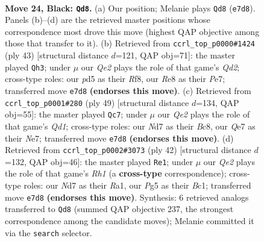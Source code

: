 \documentclass[11pt]{article}
\begin{document}
\clearpage

\begin{figure}[p]\centering
\begin{subfigure}{0.46\textwidth}\centering
\resizebox{\linewidth}{!}{%
\newchessgame
\chessboard[
  setfen={rn2r3/p2nqpkP/3p1b2/3P2p1/1R2P1P1/2NQ4/4N3/2B1K2R b K - 0 24},
  showmover=false,
  pgfstyle=straightmove, color=movearrow, markmove={e7-d8}
]}
\caption{}
\end{subfigure}\hfill
\begin{subfigure}{0.46\textwidth}\centering
\resizebox{\linewidth}{!}{%
\newchessgame
\chessboard[
  setfen={5rk1/3qppb1/2b3pp/r6n/1R5P/2NP1NP1/2QBPP2/5RK1 b - - 1 22},
  showmover=false,
  pgfstyle=straightmove, color=movearrow, markmove={d7-h3}
]}
\caption{}
\end{subfigure}
\\[4pt]
\begin{subfigure}{0.46\textwidth}\centering
\resizebox{\linewidth}{!}{%
\newchessgame
\chessboard[
  setfen={2bq1rk1/1p2n1b1/7p/2PP2p1/4p3/2N3P1/3QN1BP/R5K1 b - - 0 25},
  showmover=false,
  pgfstyle=straightmove, color=movearrow, markmove={d8-c7}
]}
\caption{}
\end{subfigure}\hfill
\begin{subfigure}{0.46\textwidth}\centering
\resizebox{\linewidth}{!}{%
\newchessgame
\chessboard[
  setfen={r3kb1r/pp1n4/1qn1p1p1/3p4/3P2Np/5N2/PP3PK1/R1BQ3R w kq - 0 22},
  showmover=false,
  pgfstyle=straightmove, color=movearrow, markmove={h1-e1}
]}
\caption{}
\end{subfigure}
\caption{\textbf{Move 24, Black: \texttt{Qd8}.} (a) Our position; Melanie plays \texttt{Qd8} (\texttt{e7d8}). Panels (b)--(d) are the retrieved master positions whose correspondence most drove this move (highest QAP objective among those that transfer to it). (b) Retrieved from \texttt{ccrl\_top\_p0000\#1424} (ply 43) [structural distance $d$=121, QAP obj=71]: the master played \texttt{Qh3}; under $\mu$ our \emph{Qe2} plays the role of that game's \emph{Qd2}; cross-type roles: our \emph{p}d5 as their \emph{R}f8, our \emph{R}e8 as their \emph{P}e7; transferred move \texttt{e7d8} \textbf{(endorses this move)}. (c) Retrieved from \texttt{ccrl\_top\_p0001\#280} (ply 49) [structural distance $d$=134, QAP obj=55]: the master played \texttt{Qc7}; under $\mu$ our \emph{Qe2} plays the role of that game's \emph{Qd1}; cross-type roles: our \emph{N}d7 as their \emph{B}c8, our \emph{Q}e7 as their \emph{N}e7; transferred move \texttt{e7d8} \textbf{(endorses this move)}. (d) Retrieved from \texttt{ccrl\_top\_p0002\#3073} (ply 42) [structural distance $d$=132, QAP obj=46]: the master played \texttt{Re1}; under $\mu$ our \emph{Qe2} plays the role of that game's \emph{Rh1} (a \textbf{cross-type} correspondence); cross-type roles: our \emph{N}d7 as their \emph{R}a1, our \emph{P}g5 as their \emph{B}c1; transferred move \texttt{e7d8} \textbf{(endorses this move)}. Synthesis: 6 retrieved analogs transferred to \texttt{Qd8} (summed QAP objective 237, the strongest correspondence among the candidate moves); Melanie committed it via the \texttt{search} selector.}
\label{fig:thought-m47}
\end{figure}
\end{document}
